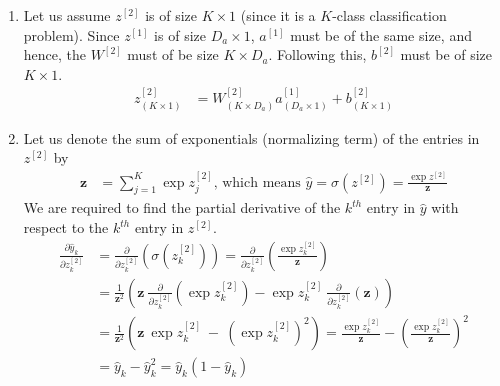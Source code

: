 \documentclass[10pt]{article}
\begin{document}
    \begin{enumerate}[label=(\alph*)]
        \item Let us assume $z^{[2]}$ is of size $K \times 1$ (since it is a $K$-class
        classification problem). Since $z^{[1]}$ is of size $D_{a} \times 1$, $a^{[1]}$
        must be of the same size, and hence, the $W^{[2]}$ must of be size $K \times D_{a}$.
        Following this, $b^{[2]}$ must be of size $K \times 1$.
        \begin{align*}
            z^{[2]}_{(K \times 1)} &= W^{[2]}_{(K \times D_{a})} a^{[1]}_{(D_{a} \times 1)} + b^{[2]}_{(K \times 1)}
        \end{align*}

        \item Let us denote the sum of exponentials (normalizing term) of the entries in $z^{[2]}$ by
        \begin{align*}
            \mathbf{z} &= \sum_{j=1}^{K} \exp{z^{[2]}_{j}} \text{, which means } \hat{y} = \sigma\left( z^{[2]} \right) = \frac{\exp{z^{[2]}}}{\mathbf{z}}
        \end{align*}
        We are required to find the partial derivative of the $k^{th}$ entry in $\hat{y}$ with respect
        to the $k^{th}$ entry in $z^{[2]}$.
        \begin{align*}
            \frac{\partial{\hat{y}_{k}}}{\partial{z^{[2]}_{k}}} &= \frac{\partial}{\partial{z^{[2]}_{k}}} \left( \sigma\left( z^{[2]}_{k} \right) \right)
            = \frac{\partial}{\partial{z^{[2]}_{k}}} \left( \frac{\exp{z^{[2]}_{k}}}{\mathbf{z}} \right) \\
            &= \frac{1}{\mathbf{z}^{2}} \left( \mathbf{z} \ \frac{\partial}{\partial{z^{[2]}_{k}}} \left( \exp{z^{[2]}_{k}} \right) -
            \exp{z^{[2]}_{k}} \ \frac{\partial}{\partial{z^{[2]}_{k}}} \left( \mathbf{z} \right) \right) \\
            &= \frac{1}{\mathbf{z}^{2}} \left( \mathbf{z} \ \exp{z^{[2]}_{k}} \ - \ \left( \exp{z^{[2]}_{k}} \right)^{2} \right)
            = \frac{\exp{z^{[2]}_{k}}}{\mathbf{z}} - \left( \frac{\exp{z^{[2]}_{k}}}{\mathbf{z}} \right)^{2} \\
            &= \hat{y}_{k} - \hat{y}_{k}^{2} = \hat{y}_{k} \left( 1 - \hat{y}_{k} \right)
        \end{align*}


\end{enumerate}
\end{document}
